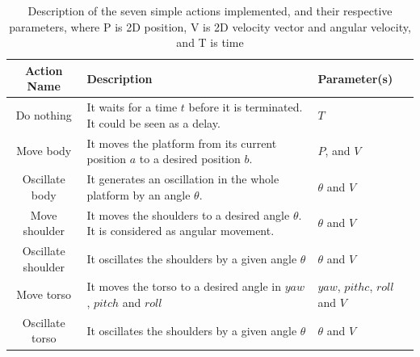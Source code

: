 \begin{table}
\centering
\caption{Description of the seven simple actions implemented, and their respective parameters, where P is 2D position, V is 2D velocity vector and angular velocity, and T is time}
\label{table:actions_implemented}
\begin{tabular}{|c|p{3.9cm}|p{1.4cm}|}
\hline
\textbf{Action Name}& \textbf{Description} &\textbf{Parameter(s)} \\
\hline
Do nothing & It waits for a time $t$ before it is terminated. It could be seen as a delay.  & $T$\\
\hline
Move body & It moves the platform from its current position $a$ to a desired position $b$. & $P$, and $V$\\
\hline
Oscillate body & It generates an oscillation in the whole platform by an angle $\theta$. &  $\theta$ and $V$ \\
\hline
Move shoulder & It moves the shoulders to a desired angle $\theta$. It is considered as angular movement. & $\theta$ and $V$ \\
\hline
Oscillate shoulder & It oscillates the shoulders by a given angle $\theta$ & $\theta$ and $V$\\
\hline
Move torso & It moves the torso to a desired angle in $yaw$, $pitch$ and $roll$& $yaw$, $pithc$, $roll$ and $V$\\
\hline
Oscillate torso & It oscillates the shoulders by a given angle $\theta$ & $\theta$ and $V$\\  
\hline
\end{tabular}
\end{table}

